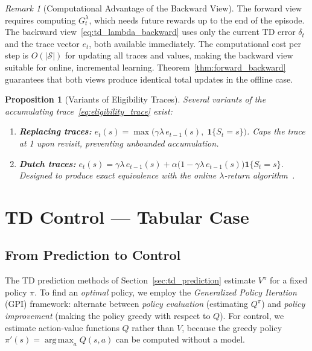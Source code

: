 \documentclass[11pt,a4paper]{article}
\theoremstyle{definition}
\theoremstyle{plain}
\newtheorem{proposition}[theorem]{Proposition}
\theoremstyle{remark}
\newtheorem{remark}{Remark}[section]
\DeclareMathOperator*{\argmax}{arg\,max}
\newcommand{\indicator}{\mathbf{1}}
\begin{document}
\begin{remark}[Computational Advantage of the Backward View]
\label{rem:backward_advantage}
The forward view requires computing $G_t^\lambda$, which needs future rewards up to the end of the episode. The backward view~\eqref{eq:td_lambda_backward} uses only the current TD error $\delta_t$ and the trace vector $e_t$, both available immediately. The computational cost per step is $O(|\mathcal{S}|)$ for updating all traces and values, making the backward view suitable for online, incremental learning. Theorem~\ref{thm:forward_backward} guarantees that both views produce identical total updates in the offline case.
\end{remark}

\begin{proposition}[Variants of Eligibility Traces]
\label{prop:trace_variants}
Several variants of the accumulating trace~\eqref{eq:eligibility_trace} exist:
\begin{enumerate}[nosep]
    \item \textbf{Replacing traces:} $e_t(s) = \max\bigl(\gamma\lambda\, e_{t-1}(s),\; \indicator\{S_t = s\}\bigr)$. Caps the trace at 1 upon revisit, preventing unbounded accumulation.
    \item \textbf{Dutch traces:} $e_t(s) = \gamma\lambda\, e_{t-1}(s) + \alpha\bigl(1 - \gamma\lambda\, e_{t-1}(s)\bigr)\indicator\{S_t = s\}$. Designed to produce exact equivalence with the online $\lambda$-return algorithm~\cite{sutton2018}.
\end{enumerate}
\end{proposition}

\section{TD Control --- Tabular Case}
\label{sec:td_control}

\subsection{From Prediction to Control}
\label{subsec:prediction_to_control}

The TD prediction methods of Section~\ref{sec:td_prediction} estimate $V^\pi$ for a fixed policy $\pi$. To find an \emph{optimal} policy, we employ the \emph{Generalized Policy Iteration} (GPI) framework: alternate between \emph{policy evaluation} (estimating $Q^\pi$) and \emph{policy improvement} (making the policy greedy with respect to $Q$). For control, we estimate action-value functions $Q$ rather than $V$, because the greedy policy $\pi'(s) = \argmax_a Q(s,a)$ can be computed without a model.
\end{document}
